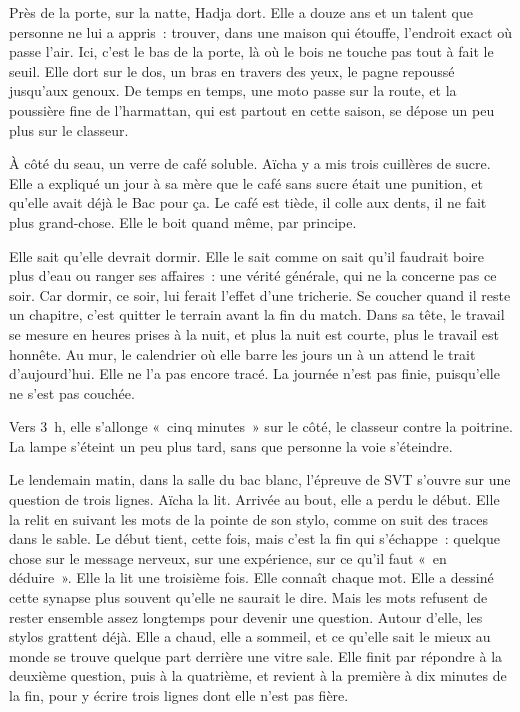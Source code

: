 \documentclass[10.5pt,twoside,openright]{book}
\begin{document}
Près de la porte, sur la natte, Hadja dort. Elle a douze ans et un talent que personne ne lui a appris : trouver, dans une maison qui étouffe, l’endroit exact où passe l’air. Ici, c’est le bas de la porte, là où le bois ne touche pas tout à fait le seuil. Elle dort sur le dos, un bras en travers des yeux, le pagne repoussé jusqu’aux genoux. De temps en temps, une moto passe sur la route, et la poussière fine de l’harmattan, qui est partout en cette saison, se dépose un peu plus sur le classeur.

À côté du seau, un verre de café soluble. Aïcha y a mis trois cuillères de sucre. Elle a expliqué un jour à sa mère que le café sans sucre était une punition, et qu’elle avait déjà le Bac pour ça. Le café est tiède, il colle aux dents, il ne fait plus grand-chose. Elle le boit quand même, par principe.

Elle sait qu’elle devrait dormir. Elle le sait comme on sait qu’il faudrait boire plus d’eau ou ranger ses affaires : une vérité générale, qui ne la concerne pas ce soir. Car dormir, ce soir, lui ferait l’effet d’une tricherie. Se coucher quand il reste un chapitre, c’est quitter le terrain avant la fin du match. Dans sa tête, le travail se mesure en heures prises à la nuit, et plus la nuit est courte, plus le travail est honnête. Au mur, le calendrier où elle barre les jours un à un attend le trait d’aujourd’hui. Elle ne l’a pas encore tracé. La journée n’est pas finie, puisqu’elle ne s’est pas couchée.

Vers 3 h, elle s’allonge « cinq minutes » sur le côté, le classeur contre la poitrine. La lampe s’éteint un peu plus tard, sans que personne la voie s’éteindre.

Le lendemain matin, dans la salle du bac blanc, l’épreuve de SVT s’ouvre sur une question de trois lignes. Aïcha la lit. Arrivée au bout, elle a perdu le début. Elle la relit en suivant les mots de la pointe de son stylo, comme on suit des traces dans le sable. Le début tient, cette fois, mais c’est la fin qui s’échappe : quelque chose sur le message nerveux, sur une expérience, sur ce qu’il faut « en déduire ». Elle la lit une troisième fois. Elle connaît chaque mot. Elle a dessiné cette synapse plus souvent qu’elle ne saurait le dire. Mais les mots refusent de rester ensemble assez longtemps pour devenir une question. Autour d’elle, les stylos grattent déjà. Elle a chaud, elle a sommeil, et ce qu’elle sait le mieux au monde se trouve quelque part derrière une vitre sale. Elle finit par répondre à la deuxième question, puis à la quatrième, et revient à la première à dix minutes de la fin, pour y écrire trois lignes dont elle n’est pas fière.
\end{document}
